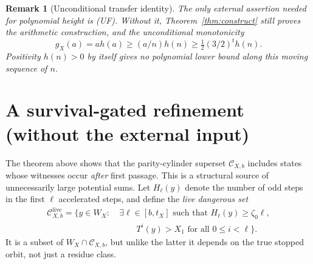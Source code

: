 \documentclass[11pt,a4paper]{article}
\newtheorem{remark}[theorem]{Remark}
\newcommand{\calC}{\mathcal C}
\begin{document}
\begin{remark}[Unconditional transfer identity]
The only external assertion needed for polynomial height is (UF).  Without it, Theorem~\ref{thm:construct} still proves the arithmetic construction, and the \emph{unconditional} monotonicity
\[
  g_X(a)=a h(a)\ge(a/n)h(n)\ge\tfrac12(3/2)^t h(n).
\]
Positivity $h(n)>0$ by itself gives no polynomial lower bound along this moving sequence of $n$.
\end{remark}

\section{A survival-gated refinement (without the external input)}
The theorem above shows that the parity-cylinder superset $\calC_{X,b}$ includes states whose witnesses occur \emph{after} first passage.  This is a structural source of unnecessarily large potential sums.  Let $H_\ell(y)$ denote the number of odd steps in the first $\ell$ accelerated steps, and define the \emph{live dangerous set}
\begin{align*}
 \calC^{\mathrm{live}}_{X,b}=\{y\in W_X:\ &\exists\ell\in[b,t_X]\text{ such that }H_\ell(y)\ge\zeta_0\ell,\\[-2pt]
 &\qquad T^i(y)>X_1\text{ for all }0\le i<\ell\}.
\end{align*}
It is a subset of $W_X\cap\calC_{X,b}$, but unlike the latter it depends on the true stopped orbit, not just a residue class.
\end{document}
